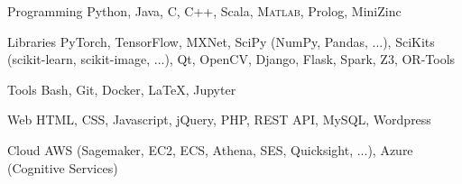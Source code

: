 

\begin{minipage}[]{0.4\textwidth}
  \vspace{2.0mm}

  \begin{cvskills}
    \cvskill
      {Programming}
      {Python, Java, C, C++, Scala, \textsc{Matlab}, Prolog, MiniZinc}

    \cvskill
      {Libraries}
      {PyTorch, TensorFlow, MXNet, SciPy (NumPy, Pandas, ...), SciKits (scikit-learn, scikit-image, ...), Qt, OpenCV, Django, Flask, Spark, Z3, OR-Tools}

    \cvskill
      {Tools}
      {Bash, Git, Docker, \LaTeX, Jupyter}

    \cvskill
      {Web}
      {HTML, CSS, Javascript, jQuery, PHP, REST API, MySQL, Wordpress}

    \cvskill
      {Cloud}
      {AWS (Sagemaker, EC2, ECS, Athena, SES, Quicksight, ...), Azure (Cognitive Services)}
  \end{cvskills}
\end{minipage}%
\begin{minipage}[]{0.6\textwidth}
  \hfill
\end{minipage}
\vspace{-2.0mm}


